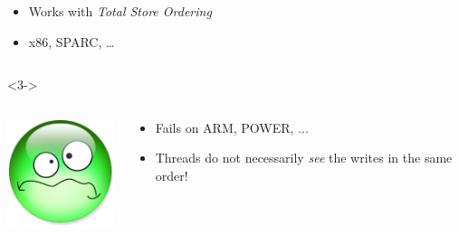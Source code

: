\documentclass[xcolor={x11names,svgnames},x11names,svgnames]{beamer}
\begin{document}
\begin{frame}[fragile, label=tso_mp]
\begin{overlayarea}{\textwidth}{1cm}
\begin{onlyenv}
\begin{columns}[c]
        \begin{column}{.9\textwidth}
          \begin{itemize}        \small
          \item Works with  \emph{Total Store Ordering}
          \item x86, SPARC, \dots
          \end{itemize}
        \end{column}
      \end{columns}
    \end{onlyenv}
    
    \begin{onlyenv}<3->  
      \begin{columns}[c]
        \begin{column}{.1\textwidth}
          \vspace{3mm}
          \includegraphics[width=\textwidth]{triste.png}
        \end{column}
        
        \begin{column}{.9\textwidth}
          \begin{itemize}        \small
          \item Fails on ARM, POWER, ...
          \item Threads do \alert{not necessarily} \emph{see} the writes in the same order!
          \end{itemize}
        \end{column}
      \end{columns}  
    \end{onlyenv}
  \end{overlayarea}
  

\end{frame}
\end{document}

